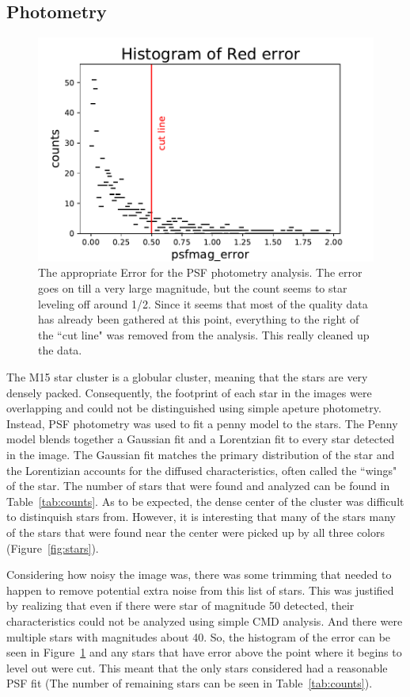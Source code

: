\documentclass[twoside,11pt]{article}
\begin{document}
\subsection{Photometry}
\begin{figure}[ht]
\centering
\includegraphics[scale=.75]{cutline.pdf}
\caption{The appropriate Error for the PSF photometry analysis. The error goes on till a very large magnitude, but the count seems to star leveling off around 1/2. Since it seems that most of the quality data has already been gathered at this point, everything to the right of the ``cut line" was removed from the analysis. This really cleaned up the data.}
\label{fig:cutline}
\end{figure}

The M15 star cluster is a globular cluster, meaning that the stars are very densely packed. Consequently, the footprint of each star in the images were overlapping and could not be distinguished using simple apeture photometry. Instead, PSF photometry was used to fit a penny model to the stars. The Penny model blends together a Gaussian fit and a Lorentzian fit to every star detected in the image. The Gaussian fit matches the primary distribution of the star and the Lorentizian accounts for the diffused characteristics, often called the ``wings" of the star. The number of stars that were found and analyzed can be found in Table~\ref{tab:counts}. As to be expected, the dense center of the cluster was difficult to distinquish stars from. However, it is interesting that many of the stars many of the stars that were found near the center were picked up by all three colors (Figure~\ref{fig:stars}). 

Considering how noisy the image was, there was some trimming that needed to happen to remove potential extra noise from this list of stars. This was justified by realizing that even if there were star of magnitude 50 detected, their characteristics could not be analyzed using simple CMD analysis. And there were multiple stars with magnitudes about 40. So, the histogram of the error can be seen in Figure~\ref{fig:cutline} and any stars that have error above the point where it begins to level out were cut. This meant that the only stars considered had a reasonable PSF fit (The number of remaining stars can be seen in Table~\ref{tab:counts}).
\end{document}
